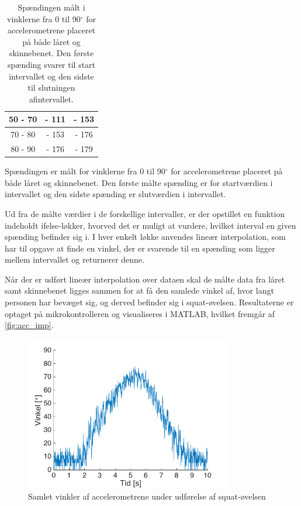 \begin{table}[H]
\begin{tabular}{lcc}
\multicolumn{1}{|c|}{50 - 70}  & \multicolumn{1}{c|}{- 111}                                         & \multicolumn{1}{c|}{- 153}                 \\ \hline
\multicolumn{1}{|c|}{70 - 80}  & \multicolumn{1}{c|}{- 153}                                         & \multicolumn{1}{c|}{- 176}                 \\ \hline
\multicolumn{1}{|c|}{80 - 90}  & \multicolumn{1}{c|}{- 176}                                         & \multicolumn{1}{c|}{- 179}                 \\ \hline
\end{tabular}
\caption{Spændingen målt i vinklerne fra 0 til 90$^{\circ}$ for accelerometrene placeret på både låret og skinnebenet. Den første spænding svarer til start intervallet og den sidste til slutningen afintervallet.}
\label{tab:vinkelinterval_psoc}  
\end{table}

\noindent
Spændingen er målt for vinklerne fra 0 til 90$^{\circ}$ for accelerometrene placeret på både låret og skinnebenet. Den første målte spænding er for startværdien i intervallet og den sidste spænding er slutværdien i intervallet.

Ud fra de målte værdier i de forskellige intervaller, er der opstillet en funktion indeholdt ifelse-løkker, hvorved det er muligt at vurdere, hvilket interval en given spænding befinder sig i. I hver enkelt løkke anvendes lineær interpolation, som har til opgave at finde en vinkel, der er svarende til en spænding som ligger mellem intervallet og returnerer denne. 

Når der er udført lineær interpolation over dataen skal de målte data fra låret samt skinnebenet ligges sammen for at få den samlede vinkel af, hvor langt personen har bevæget sig, og derved befinder sig i squat-øvelsen. Resultaterne er optaget på mikrokontrolleren og visualiseres i MATLAB, hvilket fremgår af \autoref{fig:acc_imp}.
 

\begin{figure}[H]
\centering
\includegraphics[width=0.8\textwidth]{figures/Pilotforsoeg/accvinkel}
\caption{Samlet vinkler af accelerometrene under udførelse af squat-øvelsen}
\label{fig:acc_imp}
\end{figure}



